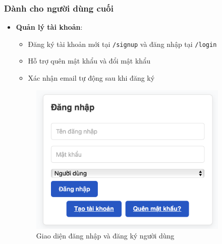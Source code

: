 \documentclass[12pt,a4paper]{article}
\begin{document}
\subsubsection{Dành cho người dùng cuối}
\begin{itemize}[leftmargin=1cm]
    \item \textbf{Quản lý tài khoản}:
        \begin{itemize}[leftmargin=0.5cm]
            \item Đăng ký tài khoản mới tại \texttt{/signup} và đăng nhập tại \texttt{/login}
            \item Hỗ trợ quên mật khẩu và đổi mật khẩu
            \item Xác nhận email tự động sau khi đăng ký
        \end{itemize}
\begin{figure}[H]
    \centering
    \includegraphics[width=0.9\textwidth]{images/ui_user_dang_nhap_dang_ky.png} %
    \caption{Giao diện đăng nhập và đăng ký người dùng}
    \label{fig:ui_user_login_signup}
\end{figure}


\end{itemize}
\end{document}
